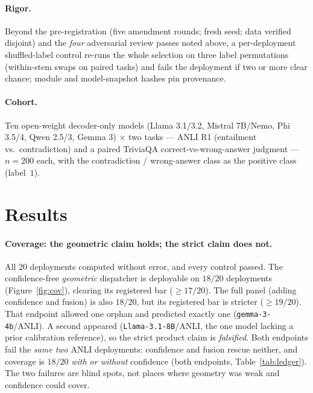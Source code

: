 \documentclass[11pt]{article}
\begin{document}
\paragraph{Rigor.} Beyond the pre-registration (five amendment rounds; fresh seed; data verified
disjoint) and the \emph{four} adversarial review passes noted above, a per-deployment shuffled-label
control re-runs the whole selection on three label permutations (within-stem swaps on paired tasks)
and fails the deployment if two or more clear chance; module and model-snapshot hashes pin
provenance.

\paragraph{Cohort.} Ten open-weight decoder-only models (Llama 3.1/3.2, Mistral 7B/Nemo, Phi 3.5/4, Qwen 2.5/3, Gemma 3)
$\times$ two tasks --- ANLI R1 \cite{anli} (entailment vs.\ contradiction) and a paired TriviaQA
\cite{triviaqa} correct-vs-wrong-answer judgment --- $n{=}200$ each, with the contradiction / wrong-answer
class as the positive class (label~$1$).

\section{Results}

\paragraph{Coverage: the geometric claim holds; the strict claim does not.}
All $20$ deployments computed without error, and every control passed. The
confidence-free \emph{geometric} dispatcher is deployable on $18/20$ deployments
(Figure~\ref{fig:cov}), clearing its registered bar ($\geq 17/20$). The full panel
(adding confidence and fusion) is also $18/20$, but its registered bar is stricter
($\geq 19/20$). That endpoint allowed one orphan and predicted exactly one
(\texttt{gemma-3-4b}/ANLI). A second appeared (\texttt{Llama-3.1-8B}/ANLI, the one model lacking a
prior calibration reference), so the strict product claim is \emph{falsified}. Both endpoints fail
the \emph{same two} ANLI deployments: confidence and fusion rescue neither, and coverage is
$18/20$ \emph{with or without} confidence (both endpoints, Table~\ref{tab:ledger}). The two failures
are blind spots, not places where geometry was weak and confidence could cover.
\end{document}

